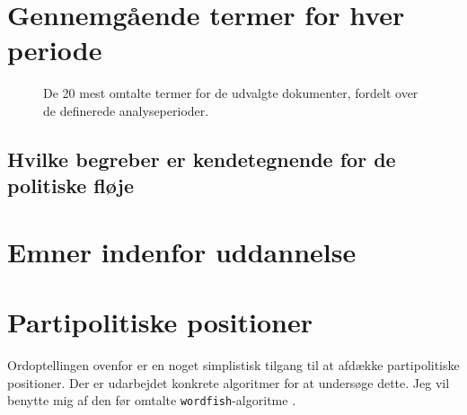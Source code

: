 \section{Gennemgående termer for hver periode}

\begin{figure}
  \caption{De 20 mest omtalte termer for de udvalgte dokumenter, fordelt over de definerede analyseperioder.} 
\end{figure}

\subsection{Hvilke begreber er kendetegnende for de politiske fløje}

\section{Emner indenfor uddannelse}

\section{Partipolitiske positioner}

Ordoptellingen ovenfor er en noget simplistisk tilgang til at afdække partipolitiske positioner.
Der er udarbejdet konkrete algoritmer for at undersøge dette.
Jeg vil benytte mig af den før omtalte \texttt{wordfish}-algoritme \autocite{slapinScalingModelEstimating2008}.

